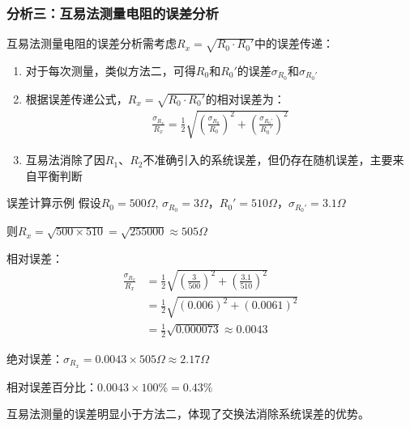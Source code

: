 \documentclass{beamer}
\begin{document}
	\begin{frame}
		\frametitle{分析三：互易法测量电阻的误差分析}
		
		\tiny %
		\setlength{\itemsep}{0pt} %
		\setlength{\abovedisplayskip}{2pt} %
		\setlength{\belowdisplayskip}{2pt} %
		
		互易法测量电阻的误差分析需考虑$R_x = \sqrt{R_0 \cdot R_0'}$中的误差传递：
		
		\begin{enumerate}
			\item 对于每次测量，类似方法二，可得$R_0$和$R_0'$的误差$\sigma_{R_0}$和$\sigma_{R_0'}$
			
			\item 根据误差传递公式，$R_x = \sqrt{R_0 \cdot R_0'}$的相对误差为：
			\begin{align}
				\frac{\sigma_{R_x}}{R_x} = \frac{1}{2}\sqrt{\left(\frac{\sigma_{R_0}}{R_0}\right)^2 + \left(\frac{\sigma_{R_0'}}{R_0'}\right)^2}
			\end{align}
			
			\item 互易法消除了因$R_1$、$R_2$不准确引入的系统误差，但仍存在随机误差，主要来自平衡判断
		\end{enumerate}
		
		\begin{alertblock}{误差计算示例}
			\scriptsize %
			假设$R_0 = 500\Omega$, $\sigma_{R_0} = 3\Omega$，$R_0' = 510\Omega$，$\sigma_{R_0'} = 3.1\Omega$
			
			则$R_x = \sqrt{500 \times 510} = \sqrt{255000} \approx 505\Omega$
			
			相对误差：
			\begin{align}
				\frac{\sigma_{R_x}}{R_x} &= \frac{1}{2}\sqrt{\left(\frac{3}{500}\right)^2 + \left(\frac{3.1}{510}\right)^2}\\
				&= \frac{1}{2}\sqrt{(0.006)^2 + (0.0061)^2}\\
				&= \frac{1}{2}\sqrt{0.000073} \approx 0.0043
			\end{align}
			
			绝对误差：$\sigma_{R_x} = 0.0043 \times 505\Omega \approx 2.17\Omega$
			
			相对误差百分比：$0.0043 \times 100\% = 0.43\%$
		\end{alertblock}
		
		\footnotesize %
		互易法测量的误差明显小于方法二，体现了交换法消除系统误差的优势。
	\end{frame}
\end{document}
